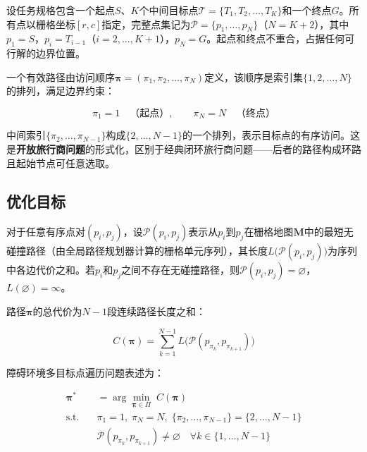 \documentclass[lettersize,journal]{IEEEtran}
\begin{document}
\label{subsec:otspp}

设任务规格包含一个起点$S$、$K$个中间目标点$\mathcal{T} = \{T_1, T_2, \dots, T_K\}$和一个终点$G$。所有点以栅格坐标$[r, c]$指定，完整点集记为$\mathcal{P} = \{p_1, \dots, p_N\}$（$N = K + 2$），其中$p_1 = S$，$p_i = T_{i-1}$（$i = 2, \dots, K+1$），$p_N = G$。起点和终点不重合，占据任何可行解的边界位置。

一个有效路径由访问顺序$\bm{\pi} = (\pi_1, \pi_2, \dots, \pi_N)$定义，该顺序是索引集$\{1, 2, \dots, N\}$的排列，满足边界约束：

\begin{equation}
\pi_1 = 1 \quad \text{（起点）}, \qquad \pi_N = N \quad \text{（终点）}
\label{eq:boundary}
\end{equation}

中间索引$\{\pi_2, \dots, \pi_{N-1}\}$构成$\{2, \dots, N-1\}$的一个排列，表示目标点的有序访问。这是\textbf{开放旅行商问题}的形式化，区别于经典闭环旅行商问题——后者的路径构成环路且起始节点可任意选取\textcolor{blue}{\cite{ref4,ref36}}。

\subsection{优化目标}

对于任意有序点对$(p_i, p_j)$，设$\mathcal{P}(p_i, p_j)$表示从$p_i$到$p_j$在栅格地图$\mathbf{M}$中的最短无碰撞路径（由全局路径规划器计算的栅格单元序列），其长度$L\big(\mathcal{P}(p_i, p_j)\big)$为序列中各边代价之和。若$p_i$和$p_j$之间不存在无碰撞路径，则$\mathcal{P}(p_i, p_j) = \varnothing$，$L(\varnothing) = \infty$。

路径$\bm{\pi}$的总代价为$N-1$段连续路径长度之和：

\begin{equation}
C(\bm{\pi}) = \sum_{k=1}^{N-1} L\big(\mathcal{P}(p_{\pi_k}, p_{\pi_{k+1}})\big)
\label{eq:totalcost}
\end{equation}

障碍环境多目标点遍历问题表述为：

\begin{align}
\bm{\pi}^{*} &= \arg\min_{\bm{\pi} \in \Pi} \; C(\bm{\pi})
\label{eq:opt}\\
\text{s.t.} \quad &\pi_1 = 1,\; \pi_N = N,\; \{\pi_2, \dots, \pi_{N-1}\} = \{2, \dots, N-1\} \nonumber\\
&\mathcal{P}(p_{\pi_k}, p_{\pi_{k+1}}) \neq \varnothing \quad \forall k \in \{1, \dots, N-1\} \nonumber
\end{align}
\end{document}
